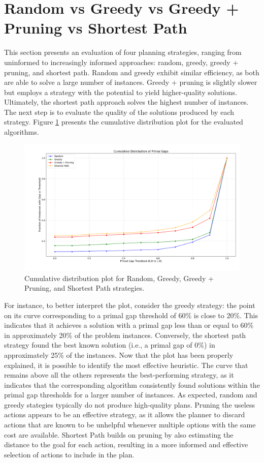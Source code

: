 \section{Random vs Greedy vs Greedy + Pruning vs Shortest Path}
This section presents an evaluation of four planning strategies, ranging from uninformed to increasingly informed approaches:
random, greedy, greedy + pruning, and shortest path.
Random and greedy exhibit similar efficiency, as both are able to solve a large number of instances. Greedy + pruning is
slightly slower but employs a strategy with the potential to yield higher-quality solutions. Ultimately, the shortest path approach
solves the highest number of instances. The next step is to evaluate the quality of the solutions produced by each strategy.
Figure \ref{fig:rgps} presents the cumulative distribution plot for the evaluated algorithms.

\begin{figure}[h!]
	\centering
	\includegraphics[width=\textwidth]{images/algs0124.png}
	\caption{Cumulative distribution plot for Random, Greedy, Greedy + Pruning, and Shortest Path strategies.}
	\label{fig:rgps}
\end{figure}

For instance, to better interpret the plot, consider the greedy strategy: the point on its curve corresponding to
a primal gap threshold of 60\% is close to 20\%. This indicates that it achieves a solution with a primal gap less than
or equal to 60\% in approximately 20\% of the problem instances.
Conversely, the shortest path strategy found the best known solution (i.e., a primal gap of 0\%) in approximately
25\% of the instances.
Now that the plot has been properly explained, it is possible to identify the most effective heuristic.
The curve that remains above all the others represents the best-performing strategy, as it indicates that the corresponding
algorithm consistently found solutions within the primal gap thresholds for a larger number of instances.
As expected, random and greedy stategies typically do not produce high-quality plans. Pruning the useless actions appears to be
an effective strategy, as it allows the planner to discard actions that are known to be unhelpful whenever multiple
options with the same cost are available.
Shortest Path builds on pruning by also estimating the distance to the goal for each action, resulting in a more
informed and effective selection of actions to include in the plan.

